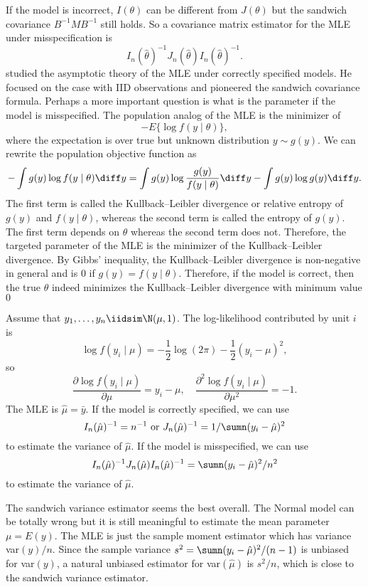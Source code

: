 If the model is incorrect, $I(\theta)$ can be different from $J(\theta)$ but the sandwich covariance $B^{-1} M B^{-1}$ still holds. So a covariance matrix estimator for the MLE under misspecification is 
$$
I_n(\hat{\theta})^{-1} J_n(\hat{\theta}) I_n(\hat{\theta})^{-1}.
$$
\citet{huber::1967} studied the asymptotic theory of the MLE under correctly specified models. He focused on the case with IID observations and pioneered
 the sandwich covariance formula. 
Perhaps a more important question is what is the parameter if the model is misspecified.  The population analog of the MLE is the minimizer of
$$
- E \{  \log f(y\mid \theta) \} ,
$$
where the expectation is over true but unknown distribution $y \sim g(y)$.  We can rewrite the population objective function as
$$
 -\int g(y) \log f(y\mid \theta)  \diff y
= \int g(y) \log  \frac{ g(y) }{ f(y\mid \theta)  }  \diff y
-\int g(y) \log  g(y)  \diff y .
$$
The first term is called the Kullback--Leibler divergence or relative entropy of $g(y)$ and $f(y\mid \theta)$, whereas the second term is called the entropy of $g(y)$. The first term depends on $\theta$ whereas the second term does not. Therefore, the targeted parameter of the MLE is the minimizer of the Kullback--Leibler divergence. By Gibbs' inequality, the  Kullback--Leibler divergence is non-negative in general and is $0$ if $g(y) = f(y\mid \theta)$. Therefore, if the model is correct, then the true $\theta$ indeed minimizes the Kullback--Leibler divergence with minimum value $0$ 
 

\begin{example}
Assume that $y_1,\ldots, y_n \iidsim  \N(\mu ,1 )$. The log-likelihood contributed by unit $i$ is 
$$
\log f(y_i \mid \mu) = -\frac{1}{2} \log (2\pi) - \frac{1}{2}  (y_i -  \mu)^2,
$$
so
$$
\frac{ \partial \log f(y_i \mid \mu) }{ \partial \mu } =  y_i -  \mu ,\quad
\frac{ \partial^2 \log f(y_i \mid \mu) }{ \partial \mu^2 } =  - 1. 
$$
The MLE is $\hat{\mu} = \bar{y}$. 
If the model is correctly specified, we can use 
$$
I_n(\hat{\mu})^{-1} = n^{-1} \text{ or }
J_n(\hat{\mu})^{-1} = 1 / \sumn  (y_i -  \hat\mu)^2
$$
to estimate the variance of $\hat{\mu}$. If the model is misspecified, we can use
$$
I_n(\hat{\mu})^{-1} J_n(\hat{\mu})I_n(\hat{\mu})^{-1} =  \sumn  (y_i -  \hat\mu)^2/n^2
$$
to estimate the variance of $\hat{\mu}$. 

The sandwich variance estimator seems the best overall. The Normal model can be totally wrong but it is still meaningful to estimate the mean parameter $\mu = E(y)$. The MLE is just the sample moment estimator which has variance var$(y)/n$. Since the sample variance $s^2 = \sumn  (y_i -  \hat\mu)^2/(n-1)$ is unbiased for var$(y)$, a natural unbiased estimator for var$(\hat{\mu})$ is $s^2/n$, which is close to the sandwich variance estimator. 
\end{example}



